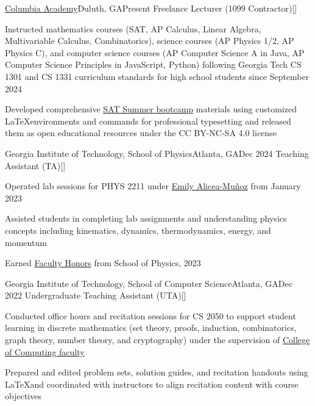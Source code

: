 \begin{resume-itemize}
  {\href{https://www.columbiaacademyga.com/}{Columbia Academy}}{Duluth, GA}{Present}
  {Freelance Lecturer (1099 Contractor)}[\href{https://github.com/JaehoonSong12/columbia_academy}{}]
  \item Instructed mathematics courses (SAT, AP Calculus, Linear Algebra, Multivariable Calculus, 
  Combinatorics), science courses (AP Physics 1/2, AP Physics C), and computer science 
  courses (AP Computer Science A in Java, AP Computer Science Principles in JavaScript, 
  Python) following Georgia Tech CS 1301 and CS 1331 curriculum standards for high 
  school students since September 2024
  \item Developed comprehensive 
  \href{https://github.com/JaehoonSong12/ydjs-publish/tree/main/clba-2025_SUMMER_complete}{SAT Summer bootcamp} 
  materials using customized \LaTeX environments and commands 
  for professional typesetting and released them as open educational resources under the CC BY-NC-SA 4.0 license
\end{resume-itemize}
\begin{resume-itemize}
  {Georgia Institute of Technology, School of Physics}{Atlanta, GA}{Dec 2024}
  {Teaching Assistant (TA)}[\href{https://github.com/YundaeLeeSong/ydjs-references/tree/main/work2412-gt_physics_ta}{}]
  \item Operated lab sessions for PHYS 2211 under \href{https://physics.gatech.edu/user/emily-alicea-munoz}{Emily Alicea-Muñoz} from January 2023
  \item Assisted students in completing lab assignments and understanding physics concepts including kinematics, dynamics, thermodynamics, energy, and momentum
  \item Earned \href{https://gatech.meritpages.com/stories/Jaehoon-Song-Earns-Faculty-Honors-at-Georgia-Tech-for-the-Fall-2023-Semester/125669685}{Faculty Honors} from School of Physics, 2023
\end{resume-itemize}
\begin{resume-itemize}
  {Georgia Institute of Technology, School of Computer Science}{Atlanta, GA}{Dec 2022}
  {Undergraduate Teaching Assistant (UTA)}[\href{https://github.com/YundaeLeeSong/ydjs-references/tree/main/work2212-gt_compsci_ta}{}]
  \item Conducted office hours and recitation sessions for CS 2050 to support student learning in 
  discrete mathematics (set theory, proofs, induction, combinatorics, graph theory, number theory, and cryptography) 
  under the supervision of \href{https://www.cc.gatech.edu/people/faculty}{College of Computing faculty}
  \item Prepared and edited problem sets, solution guides, and recitation handouts using 
  \LaTeX and coordinated with instructors to align recitation content with course objectives
\end{resume-itemize}
